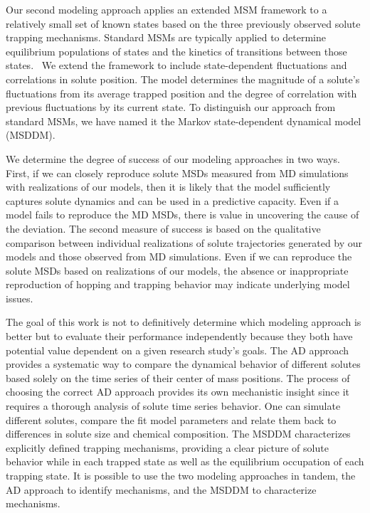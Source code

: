\documentclass[journal=ancac3,manuscript=article,layout=twocolumn]{achemso}
\begin{document}
  Our second modeling approach applies an extended MSM framework to a
  relatively small set of known states based on the three previously observed
  solute trapping mechanisms. Standard MSMs are typically applied to determine
  equilibrium populations of states and the kinetics of transitions between
  those states.~\cite{bowman_using_2009} We extend the framework to include
  state-dependent fluctuations and correlations in solute position. The model
  determines the magnitude of a solute's fluctuations from its average trapped
  position and the degree of correlation with previous fluctuations by its current
  state. To distinguish our approach from standard MSMs, we have named it the
  Markov state-dependent dynamical model (MSDDM).
  
  We determine the degree of success of our modeling approaches in two ways.
  First, if we can closely reproduce solute MSDs measured from MD simulations
  with realizations of our models, then it is likely that the model
  sufficiently captures solute dynamics and can be used in a predictive
  capacity. Even if a model fails to reproduce the MD MSDs, there is value in
  uncovering the cause of the deviation. The second measure of success is based
  on the qualitative comparison between individual realizations of solute 
  trajectories generated by our models and those observed from MD simulations. 
  Even if we can reproduce the solute MSDs based on realizations of our models,
  the absence or inappropriate reproduction of hopping and trapping behavior may
  indicate underlying model issues. 
  
  The goal of this work is not to definitively determine which modeling
  approach is better but to evaluate their performance independently because
  they both have potential value dependent on a given research study's goals.
  The AD approach provides a systematic way to compare the dynamical behavior
  of different solutes based solely on the time series of their center of mass
  positions. The process of choosing the correct AD approach provides its own
  mechanistic insight since it requires a thorough analysis of solute time
  series behavior. One can simulate different solutes, compare the fit model
  parameters and relate them back to differences in solute size and chemical
  composition. The MSDDM characterizes explicitly defined trapping mechanisms,
  providing a clear picture of solute behavior while in each trapped state as
  well as the equilibrium occupation of each trapping state.  It is possible to
  use the two modeling approaches in tandem, the AD approach to identify
  mechanisms, and the MSDDM to characterize mechanisms. 
  
\end{document}
